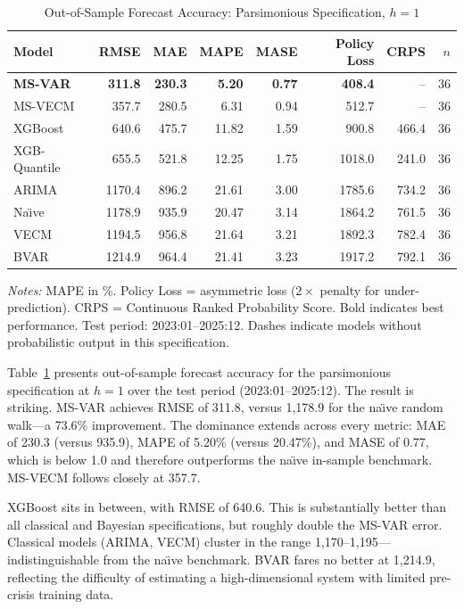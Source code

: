 \documentclass[12pt,a4paper]{article}
\begin{document}
\begin{table}[htbp]
\centering
\caption{Out-of-Sample Forecast Accuracy: Parsimonious Specification, $h = 1$}
\label{tab:main_accuracy}
\begin{tabular}{lrrrrrrr}
\toprule
Model & RMSE & MAE & MAPE & MASE & Policy Loss & CRPS & $n$ \\
\midrule
\textbf{MS-VAR} & \textbf{311.8} & \textbf{230.3} & \textbf{5.20} & \textbf{0.77} & \textbf{408.4} & -- & 36 \\
MS-VECM & 357.7 & 280.5 & 6.31 & 0.94 & 512.7 & -- & 36 \\
XGBoost & 640.6 & 475.7 & 11.82 & 1.59 & 900.8 & 466.4 & 36 \\
XGB-Quantile & 655.5 & 521.8 & 12.25 & 1.75 & 1018.0 & 241.0 & 36 \\
ARIMA & 1170.4 & 896.2 & 21.61 & 3.00 & 1785.6 & 734.2 & 36 \\
Na\"{\i}ve & 1178.9 & 935.9 & 20.47 & 3.14 & 1864.2 & 761.5 & 36 \\
VECM & 1194.5 & 956.8 & 21.64 & 3.21 & 1892.3 & 782.4 & 36 \\
BVAR & 1214.9 & 964.4 & 21.41 & 3.23 & 1917.2 & 792.1 & 36 \\
\bottomrule
\end{tabular}
\begin{tablenotes}
\small
\item \textit{Notes:} MAPE in \%. Policy Loss = asymmetric loss ($2\times$ penalty for under-prediction). CRPS = Continuous Ranked Probability Score. Bold indicates best performance. Test period: 2023:01--2025:12. Dashes indicate models without probabilistic output in this specification.
\end{tablenotes}
\end{table}

Table~\ref{tab:main_accuracy} presents out-of-sample forecast accuracy for the parsimonious specification at $h=1$ over the test period (2023:01--2025:12). The result is striking. MS-VAR achieves RMSE of 311.8, versus 1,178.9 for the na\"{\i}ve random walk---a 73.6\% improvement. The dominance extends across every metric: MAE of 230.3 (versus 935.9), MAPE of 5.20\% (versus 20.47\%), and MASE of 0.77, which is below 1.0 and therefore outperforms the na\"{\i}ve in-sample benchmark. MS-VECM follows closely at 357.7.

XGBoost sits in between, with RMSE of 640.6. This is substantially better than all classical and Bayesian specifications, but roughly double the MS-VAR error. Classical models (ARIMA, VECM) cluster in the range 1,170--1,195---indistinguishable from the na\"{\i}ve benchmark. BVAR fares no better at 1,214.9, reflecting the difficulty of estimating a high-dimensional system with limited pre-crisis training data.
\end{document}
